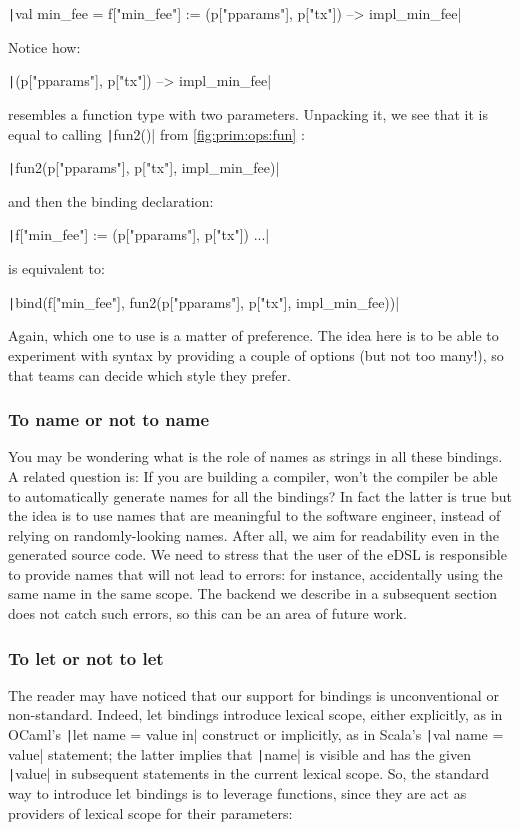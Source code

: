 \documentclass[11pt]{article}
\renewcommand{\vref}[1]{\autoref{#1} \vpageref{#1}}{}
\newcommand{\ScalaI}[1]{\texttt|#1|}
\newcommand{\TextI}[1]{\texttt|#1|}
\begin{document}
\ScalaI{val min_fee = f["min_fee"] := (p["pparams"], p["tx"]) --> impl_min_fee}

\noindent Notice how:

\ScalaI{(p["pparams"], p["tx"]) --> impl_min_fee}

\noindent resembles a function type with two parameters. Unpacking it, we see that it is equal to calling \ScalaI{fun2()} from \vref{fig:prim:ops:fun}:

\ScalaI{fun2(p["pparams"], p["tx"], impl_min_fee)}

\noindent and then the binding declaration:

\ScalaI{f["min_fee"] := (p["pparams"], p["tx"]) ...}

\noindent is equivalent to:

\ScalaI{bind(f["min_fee"], fun2(p["pparams"], p["tx"], impl_min_fee))}

\noindent Again, which one to use is a matter of preference. The idea here is to be able to experiment with syntax by providing a couple of options (but not too many!), so that teams can decide which style they prefer. 

\subsubsection{To name or not to name}
You may be wondering what is the role of names as strings in all these bindings. A related question is: If you are building a compiler, won't the compiler be able to automatically generate names for all the bindings? In fact the latter is true but the idea is to use names that are meaningful to the software engineer, instead of relying on randomly-looking names. After all, we aim for readability even in the generated source code. We need to stress that the user of the eDSL is responsible to provide names that will not lead to errors: for instance, accidentally using the same name in the same scope. The backend we describe in a subsequent section does not catch such errors, so this can be an area of future work.

\subsubsection{To let or not to let}
The reader may have noticed that our support for bindings is unconventional or non-standard. Indeed, let bindings introduce lexical scope, either explicitly, as in OCaml's \TextI{let name = value in} construct or implicitly, as in Scala's \ScalaI{val name = value} statement; the latter implies that \ScalaI{name} is visible and has the given \ScalaI{value} in subsequent statements in the current lexical scope. So, the standard way to introduce let bindings is to leverage functions, since they are act as providers of lexical scope for their parameters:
\end{document}
